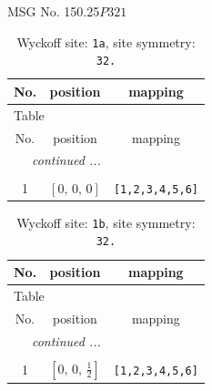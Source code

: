 \documentclass[fleqn,8pt]{jsarticle}
\begin{document}
\setcounter{MaxMatrixCols}{32}

\renewcommand{\tablename}{Table~}
\renewcommand{\figurename}{Figure~}
\begin{center}
\LARGE
MSG No. 150.25\quad$P321$
\end{center}
\renewcommand{\arraystretch}{1.2}
\begin{longtable}{ccc}
\caption{Wyckoff site: {\tt 1a}, site symmetry: {\tt 32.}}
 \\
 \hline \hline
No. & position & mapping \\ \hline \endfirsthead

\multicolumn{2}{l}{\tablename\ \thetable{}} \\
 \hline \hline
No. & position & mapping \\ \hline \endhead

 \hline \hline
\multicolumn{2}{r}{\footnotesize\it continued ...} \\ \endfoot

 \hline \hline
\multicolumn{2}{r}{} \\ \endlastfoot

1 & $\left[ 0,\, 0,\, 0 \right]$ & {\tt [1,2,3,4,5,6]} \\
\end{longtable}
\renewcommand{\arraystretch}{1.2}
\begin{longtable}{ccc}
\caption{Wyckoff site: {\tt 1b}, site symmetry: {\tt 32.}}
 \\
 \hline \hline
No. & position & mapping \\ \hline \endfirsthead

\multicolumn{2}{l}{\tablename\ \thetable{}} \\
 \hline \hline
No. & position & mapping \\ \hline \endhead

 \hline \hline
\multicolumn{2}{r}{\footnotesize\it continued ...} \\ \endfoot

 \hline \hline
\multicolumn{2}{r}{} \\ \endlastfoot

1 & $\left[ 0,\, 0,\, \frac{1}{2} \right]$ & {\tt [1,2,3,4,5,6]} \\
\end{longtable}
\renewcommand{\arraystretch}{1.2}
\end{document}
